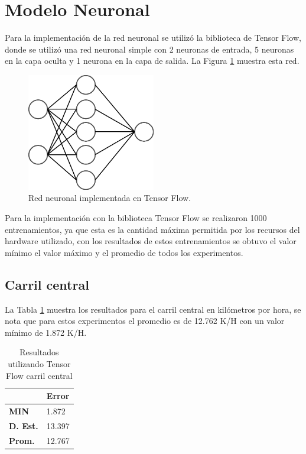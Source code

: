 \section{Modelo Neuronal}

Para la implementación de la red neuronal se utilizó la biblioteca de Tensor Flow, donde se utilizó una red neuronal simple con 2 neuronas de entrada, 5 neuronas en la capa oculta y 1 neurona en la capa de salida. La Figura \ref{fig:RedTF} muestra esta red.

\begin{figure}[H]
    \centering
    \includegraphics[width=0.5\textwidth]{Resultados/imgs/RedTF.png}
    \caption{Red neuronal implementada en Tensor Flow.}
    \label{fig:RedTF}
\end{figure}

Para la implementación con la biblioteca Tensor Flow se realizaron 1000 entrenamientos, ya que esta es la cantidad máxima permitida por los recursos del hardware utilizado, con los resultados de estos entrenamientos se obtuvo el valor mínimo el valor máximo y el promedio de todos los experimentos.

\subsection{Carril central}

La Tabla \ref{tab:resultadosTFCCentral} muestra los resultados para el carril central en kilómetros por hora, se nota que para estos experimentos el promedio es de 12.762 K/H con un valor mínimo de 1.872 K/H.

\begin{table}[H]
    \centering
    \caption{Resultados utilizando Tensor Flow carril central}
    \label{tab:resultadosTFCCentral}
    \begin{tabular}{|l|l|}
    \hline
    \textbf{} & \textbf{Error} \\ \hline
    \textbf{MIN} & 1.872 \\ \hline
    \textbf{D. Est.} & 13.397 \\ \hline
    \textbf{Prom.} & 12.767 \\ \hline
    \end{tabular}
\end{table}



